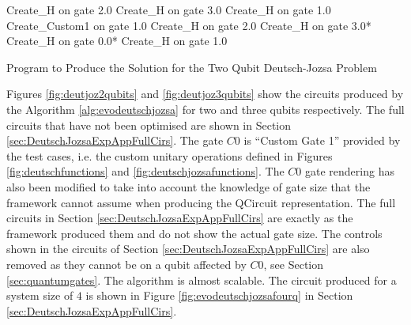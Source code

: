 \begin{algorithm}
 \begin{algorithmic}
\STATE Create\_H on gate 2.0
\STATE Create\_H on gate 3.0
\STATE Create\_H on gate 1.0
\STATE Create\_Custom1 on gate 1.0
\STATE Create\_H on gate 2.0
\STATE Create\_H on gate 3.0*
\STATE Create\_H on gate 0.0*
\STATE Create\_H on gate 1.0
 \end{algorithmic}
\caption{Program to Produce the Solution for the Two Qubit Deutsch-Jozsa Problem}
\label{alg:deutjozsatwoqubits}
\end{algorithm}


Figures \ref{fig:deutjoz2qubits} and \ref{fig:deutjoz3qubits} show the circuits produced by the Algorithm \ref{alg:evodeutschjozsa} for two and three qubits respectively.
The full circuits that have not been optimised are shown in Section \ref{sec:DeutschJozsaExpAppFullCirs}.
The gate $C0$ is ``Custom Gate 1'' provided by the test cases, i.e. the custom unitary operations defined in Figures \ref{fig:deutschfunctions} and \ref{fig:deutschjozsafunctions}.
The $C0$ gate rendering has also been modified to take into account the knowledge of gate size that the framework cannot assume when producing the QCircuit representation.
The full circuits in Section \ref{sec:DeutschJozsaExpAppFullCirs} are exactly as the framework produced them and do not show the actual gate size.
The controls shown in the circuits of Section \ref{sec:DeutschJozsaExpAppFullCirs} are also removed as they cannot be on a qubit affected by $C0$, see Section \ref{sec:quantumgates}.
The algorithm is almost scalable.
The circuit produced for a system size of $4$ is shown in Figure \ref{fig:evodeutschjozsafourq} in Section \ref{sec:DeutschJozsaExpAppFullCirs}.


